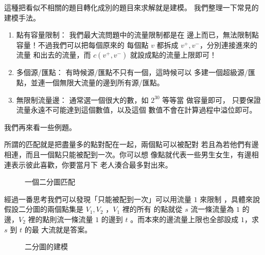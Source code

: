 \documentclass[a4paper,12pt]{book}
\begin{document}
這種把看似不相關的題目轉化成別的題目來求解就是建模。
我們整理一下常見的建模手法。
\begin{enumerate}
  \item 點有容量限制： 我們最大流問題中的流量限制都是在
    邊上而已，無法限制點容量！不過我們可以把每個原來的
    每個點 $v$ 都拆成 $v^+, v^-$，分別連接進來的流量
    和出去的流量，而 $c(v^+, v^-)$ 就設成點的流量上限即可！

  \item 多個源/匯點： 有時候源/匯點不只有一個，這時候可以
    多建一個超級源/匯點，並連一個無限大流量的邊到所有源/匯點。

  \item 無限制流量邊： 通常選一個很大的數，如 $2^{30}$ 等等當
    做容量即可， 只要保證流量永遠不可能達到這個數值，以及這個
    數值不會在計算過程中溢位即可。
\end{enumerate}
我們再來看一些例題。


所謂的匹配就是把盡量多的點對配在一起，兩個點可以被配對
若且為若他們有邊相連，而且一個點只能被配到一次。你可以想
像點就代表一些男生女生，有邊相連表示彼此喜歡，你要當月下
老人湊合最多對出來。

\begin{figure}[H]
  \centering
  
  \caption{一個二分圖匹配}
\end{figure}

經過一番思考我們可以發現「只能被配到一次」可以用流量 $1$ 來限制
，具體來說假設二分圖的兩個點集是 $V_1, V_2$ ，$V_1$ 裡的所有
的點就從 $s$ 流一條流量為 $1$ 的邊，$V_2$ 裡的點則流一條流量 $1$ 
的邊到 $t$ 。而本來的邊流量上限也全部設成 $1$，求 $s$ 到 $t$ 的最
大流就是答案。

\begin{figure}[H]
  \centering
  
  \caption{二分圖的建模}
\end{figure}
\end{document}
